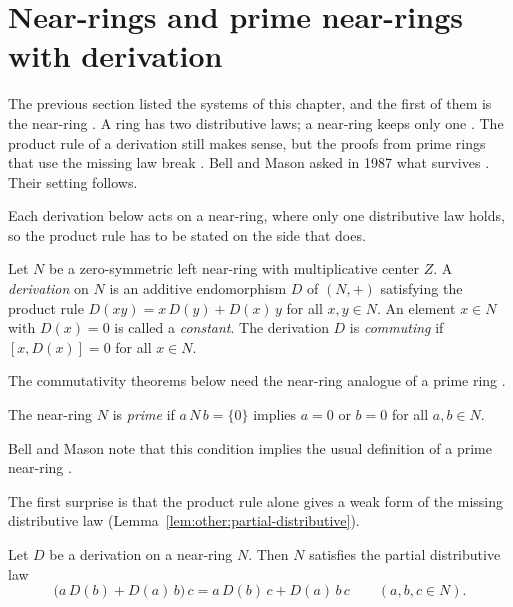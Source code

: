 \section{Near-rings and prime near-rings with derivation}\label{sec:other-systems:near-rings}

The previous section listed the systems of this chapter, and the first of
them is the near-ring \cite[p.~31]{BellMason1987}. A ring has two
distributive laws; a near-ring keeps only one
\cite[p.~31]{BellMason1987}. The product rule of a derivation still makes
sense, but the proofs from prime rings that use the missing law break
\cite[p.~31]{BellMason1987}. Bell and Mason asked in 1987
what survives \cite[p.~31]{BellMason1987}. Their setting follows.

Each derivation below acts on a near-ring, where only one distributive law
holds, so the product rule has to be stated on the side that does. %

\begin{definition}\label{def:other:near-ring-derivation}
Let $N$ be a zero-symmetric left near-ring with multiplicative center $Z$.
A \emph{derivation} on $N$ is an additive endomorphism $D$ of $(N, +)$
satisfying the product rule $D(xy) = x\,D(y) + D(x)\,y$ for all $x, y \in N$.
An element $x \in N$ with $D(x) = 0$ is called a \emph{constant}. The
derivation $D$ is \emph{commuting} if $[x, D(x)] = 0$ for all $x \in N$.
\end{definition}

The commutativity theorems below need the near-ring analogue of a prime
ring \cite[p.~31]{BellMason1987}.

\begin{definition}\label{def:other:prime-near-ring}
The near-ring $N$ is \emph{prime} if $a\,N\,b = \{0\}$ implies $a = 0$ or
$b = 0$ for all $a, b \in N$.
\end{definition}

Bell and Mason note that this condition implies the usual definition of a
prime near-ring \cite[p.~31]{BellMason1987}.

The first surprise is that the product rule alone gives a weak form of the
missing distributive law (Lemma~\ref{lem:other:partial-distributive}).

\begin{lemma}\label{lem:other:partial-distributive}
Let $D$ be a derivation on a near-ring $N$. Then $N$ satisfies the partial
distributive law
\[
\bigl(a\,D(b) + D(a)\,b\bigr)\,c = a\,D(b)\,c + D(a)\,b\,c
\qquad (a, b, c \in N).
\]
\end{lemma}

